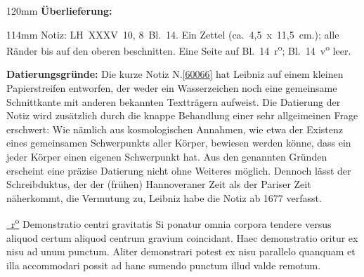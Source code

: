 
\begin{ledgroupsized}[r]{120mm}
\footnotesize
\pstart
\noindent\textbf{Überlieferung:}
\pend
\end{ledgroupsized}
\begin{ledgroupsized}[r]{114mm}
\footnotesize
\pstart
\parindent -6mm
%
Notiz:
LH~XXXV~10, 8~Bl.~14. 
Ein Zettel (ca.~4,5~x~11,5~cm.);
alle Ränder bis auf den oberen beschnitten. 
Eine Seite auf Bl.~14~r\textsuperscript{o}; Bl.~14~v\textsuperscript{o} leer.
\pend
\end{ledgroupsized}
\vspace{5mm}
\begin{ledgroup}
\footnotesize
\pstart
\noindent
\textbf{Datierungsgründe:}
Die kurze Notiz N.\;\ref{60066} hat Leibniz auf einem kleinen Papierstreifen entworfen, der weder ein Wasserzeichen noch eine gemeinsame Schnittkante mit anderen bekannten Textträgern aufweist.
Die Datierung der Notiz wird zusätzlich durch die knappe Behandlung einer sehr allgeimeinen Frage erschwert: Wie nämlich aus kosmologischen Annahmen, wie etwa der Existenz eines gemeinsamen Schwerpunkts aller Körper, bewiesen werden könne, dass ein jeder Körper einen eigenen Schwerpunkt hat.
\pend
\pstart
Aus den genannten Gründen erscheint eine präzise Datierung nicht ohne Weiteres möglich. Dennoch lässt der Schreibduktus, der der (frühen) Hannoveraner Zeit als der Pariser Zeit näherkommt, die Vermutung zu, Leibniz habe die Notiz ab 1677 verfasst.
\pend 
\end{ledgroup}
\vspace{8mm}
\pstart
\centering
\href{\Scan{LH_35_10_08_014r}}%
{~r\textsuperscript{o}\rbrack}  
\hfill
Demonstratio centri
%
%
gravitatis
\hfill
{}
\pend 
\nobreak
\vspace{0.5\baselineskip}
\pstart
\noindent
Si ponatur
omnia corpora tendere versus aliquod
certum aliquod centrum
gravium coincidant.
\pend
\pstart
Haec demonstratio 
oritur ex nisu ad unum punctum.
Aliter demonstrari potest ex nisu parallelo quanquam 
et illa accommodari possit ad hanc sumendo punctum illud valde remotum.
\pend
